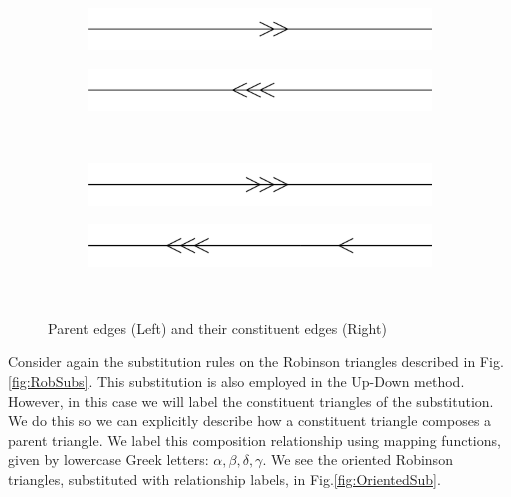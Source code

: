 \documentclass[
  oneside,
  11pt, a4paper,
  footinclude=true,
  headinclude=true,
  cleardoublepage=empty
]{scrbook}
\begin{document}
\begin{figure}[H]
        \begin{subfigure}[t]{0.4\textwidth}
                \includegraphics[width=\textwidth]{a3}
        \end{subfigure}\hfill
        \begin{subfigure}[t]{0.4\textwidth}
                \includegraphics[width=\textwidth]{a3inflate}
        \end{subfigure}\\                           
        
        \begin{subfigure}[t]{0.4\textwidth}
                \includegraphics[width=\textwidth]{a4}
        \end{subfigure}\hfill
        \begin{subfigure}[t]{0.4\textwidth}
                \includegraphics[width=\textwidth]{a4inflate}
        \end{subfigure}\\   
        \caption[Edge Composition Rules]{Parent edges (Left) and their constituent edges (Right)}     
        \label{fig:EdgeRules}
\end{figure} 
Consider again the substitution rules on the Robinson triangles described in Fig.\ref{fig:RobSubs}. This substitution is also employed in the Up-Down method. However, in this case we will label the constituent triangles of the substitution. We do this so we can explicitly describe how a constituent triangle composes a parent triangle. We label this composition relationship using mapping functions, given by lowercase Greek letters: $\alpha, \beta, \delta, \gamma$. We see the oriented Robinson triangles, substituted with relationship labels, in Fig.\ref{fig:OrientedSub}.
\end{document}
